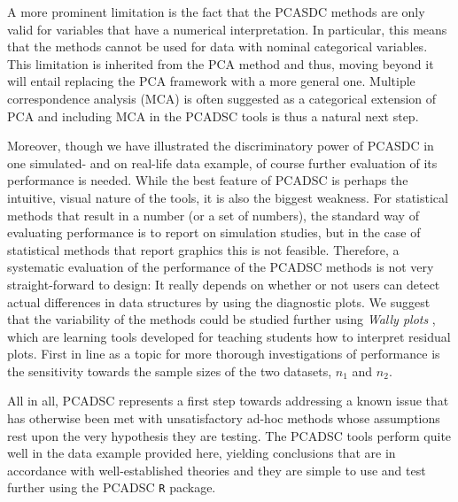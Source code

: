 \documentclass[a4paper,14pt]{article}
\begin{document}
A more prominent limitation is the fact that the PCASDC methods are only valid for variables that have a numerical interpretation. In particular, this means that the methods cannot be used for data with nominal categorical variables. This limitation is inherited from the PCA method and thus, moving beyond it will entail replacing the PCA framework with a more general one. Multiple correspondence analysis (MCA) is often suggested as a categorical extension of PCA \cite{Abdi2010} and including MCA in the PCADSC tools is thus a natural next step.

Moreover, though we have illustrated the discriminatory power of PCASDC in one simulated- and on real-life data example, of course further evaluation of its performance is needed.
While the best feature of PCADSC is perhaps the intuitive, visual nature of the tools, it is also the biggest weakness. For statistical methods that result in a number (or a set of numbers), the standard way of evaluating performance is to report on simulation studies, but in the case of statistical methods that report graphics this is not feasible. Therefore, a systematic evaluation of the performance of the PCADSC methods is not very straight-forward to design: It really depends on whether or not users can detect actual differences in data structures by using the diagnostic plots. We suggest that the variability of the methods could be studied further using \textit{Wally plots} \cite{Ekstrom2014}, which are learning tools developed for teaching students how to interpret residual plots. First in line as a topic for more thorough investigations of performance is the sensitivity towards the sample sizes of the two datasets, $n_1$ and $n_2$.

All in all, PCADSC represents a first step towards addressing a known issue that has otherwise been met with unsatisfactory ad-hoc methods whose assumptions rest upon the very hypothesis they are testing. The PCADSC tools perform quite well in the data example provided here, yielding conclusions that are in accordance with well-established theories and they are simple to use and test further using the PCADSC \texttt{R} package.



%
%
%
\end{document}
